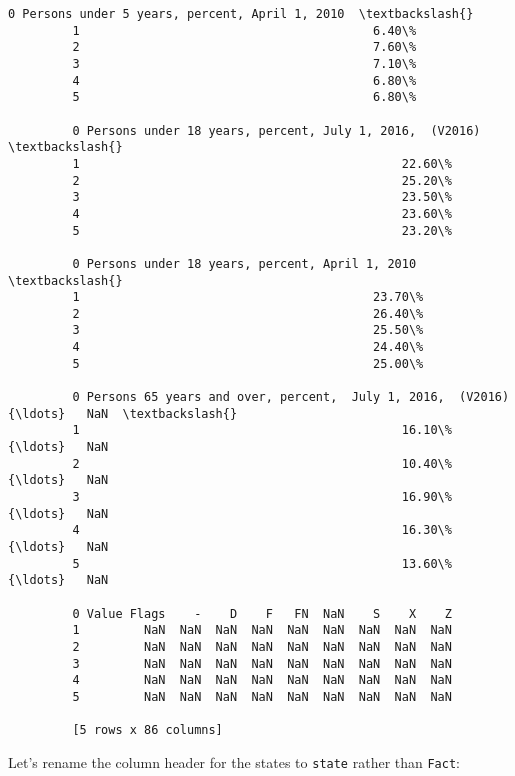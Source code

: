 \documentclass[11pt]{article}
\begin{document}
\begin{Verbatim}[commandchars=\\\{\}]
         0 Persons under 5 years, percent, April 1, 2010  \textbackslash{}
         1                                         6.40\%   
         2                                         7.60\%   
         3                                         7.10\%   
         4                                         6.80\%   
         5                                         6.80\%   
         
         0 Persons under 18 years, percent, July 1, 2016,  (V2016)  \textbackslash{}
         1                                             22.60\%        
         2                                             25.20\%        
         3                                             23.50\%        
         4                                             23.60\%        
         5                                             23.20\%        
         
         0 Persons under 18 years, percent, April 1, 2010  \textbackslash{}
         1                                         23.70\%   
         2                                         26.40\%   
         3                                         25.50\%   
         4                                         24.40\%   
         5                                         25.00\%   
         
         0 Persons 65 years and over, percent,  July 1, 2016,  (V2016) {\ldots}   NaN  \textbackslash{}
         1                                             16.10\%          {\ldots}   NaN   
         2                                             10.40\%          {\ldots}   NaN   
         3                                             16.90\%          {\ldots}   NaN   
         4                                             16.30\%          {\ldots}   NaN   
         5                                             13.60\%          {\ldots}   NaN   
         
         0 Value Flags    -    D    F   FN  NaN    S    X    Z  
         1         NaN  NaN  NaN  NaN  NaN  NaN  NaN  NaN  NaN  
         2         NaN  NaN  NaN  NaN  NaN  NaN  NaN  NaN  NaN  
         3         NaN  NaN  NaN  NaN  NaN  NaN  NaN  NaN  NaN  
         4         NaN  NaN  NaN  NaN  NaN  NaN  NaN  NaN  NaN  
         5         NaN  NaN  NaN  NaN  NaN  NaN  NaN  NaN  NaN  
         
         [5 rows x 86 columns]
\end{Verbatim}
            
    Let's rename the column header for the states to \texttt{state} rather
than \texttt{Fact}:
\end{document}
